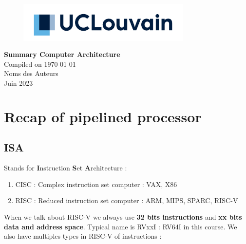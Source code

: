 \documentclass{report}
\begin{document}


\begin{titlepage}
    \begin{figure}
        \includegraphics[height = 2cm]{UCL_Logo.png}
        \label{fig:my_label}
    \end{figure}

    \hspace*{100cm}
    \centering
    \vspace*{7cm}

    {\Huge \textbf{Summary Computer Architecture}}\\
    \vspace*{0.25cm}
    Compiled on \today\\
    \vspace*{0.25cm}
    \Large{Noms des Auteurs}\\

    \vspace*{9.5cm} %
    {\Large Juin 2023}
\end{titlepage}

\tableofcontents
\newpage


\chapter{Recap of pipelined processor}

\section{ISA}

Stands for \textbf{I}nstruction \textbf{S}et \textbf{A}rchitecture : 
\begin{enumerate}
    \item CISC : Complex instruction set computer : VAX, X86
    \item RISC : Reduced instruction set computer : ARM, MIPS, SPARC, RISC-V
\end{enumerate}

When we talk about RISC-V we always use \textbf{32 bits instructions} and \textbf{xx bits data and address space}. Typical name is RVxxI : RV64I in this course. We also have multiples types in RISC-V of instructions :
\end{document}
